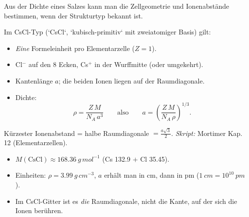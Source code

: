 

Aus der Dichte eines Salzes kann man die Zellgeometrie und Ionenabstände
bestimmen, wenn der Strukturtyp bekannt ist.

\begin{werkzeugkasten}
Im CsCl-Typ (`CsCl`, `kubisch-primitiv` mit zweiatomiger Basis) gilt:
\begin{itemize}
  \item \emph{Eine} Formeleinheit pro Elementarzelle ($Z=1$).
  \item Cl$^-$ auf den 8 Ecken, Cs$^+$ in der Wurffmitte (oder umgekehrt).
  \item Kantenlänge $a$; die beiden Ionen liegen auf der Raumdiagonale.
  \item Dichte:
    \[
      \rho = \frac{Z\,M}{N_A\,a^3}\qquad\text{also}\qquad
      a = \left(\frac{Z\,M}{N_A\,\rho}\right)^{1/3}.
    \]
\end{itemize}
Kürzester Ionenabstand = halbe Raumdiagonale $= \frac{a\sqrt{3}}{2}$.
\textit{Skript:} Mortimer Kap. 12 (Elementarzellen).
\end{werkzeugkasten}

\begin{achtung}
\begin{itemize}
  \item $M(\mathrm{CsCl}) \approx 168.36\ g\,mol^{-1}$ (Cs 132.9 $+$ Cl 35.45).
  \item Einheiten: $\rho = 3.99\ g\,cm^{-3}$, $a$ erhält man in cm, dann in pm
        ($1\ cm = 10^{10}\ pm$).
  \item Im CsCl-Gitter ist es \emph{die} Raumdiagonale, nicht die Kante, auf
        der sich die Ionen berühren.
\end{itemize}
\end{achtung}
